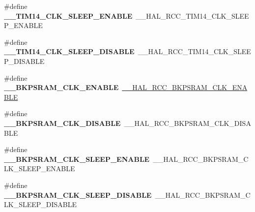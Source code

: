 \begin{DoxyCompactItemize}
\mbox{\label{group___h_a_l___r_c_c___aliased_ga665eb8ea877917808e0be7ef467d1a0d}} 
\#define {\bfseries \+\_\+\+\_\+\+T\+I\+M14\+\_\+\+C\+L\+K\+\_\+\+S\+L\+E\+E\+P\+\_\+\+E\+N\+A\+B\+LE}~\+\_\+\+\_\+\+H\+A\+L\+\_\+\+R\+C\+C\+\_\+\+T\+I\+M14\+\_\+\+C\+L\+K\+\_\+\+S\+L\+E\+E\+P\+\_\+\+E\+N\+A\+B\+LE
\item 
\mbox{\label{group___h_a_l___r_c_c___aliased_ga71fcbff820f7263e13dbbb2b1ae224dc}} 
\#define {\bfseries \+\_\+\+\_\+\+T\+I\+M14\+\_\+\+C\+L\+K\+\_\+\+S\+L\+E\+E\+P\+\_\+\+D\+I\+S\+A\+B\+LE}~\+\_\+\+\_\+\+H\+A\+L\+\_\+\+R\+C\+C\+\_\+\+T\+I\+M14\+\_\+\+C\+L\+K\+\_\+\+S\+L\+E\+E\+P\+\_\+\+D\+I\+S\+A\+B\+LE
\item 
\mbox{\label{group___h_a_l___r_c_c___aliased_ga1ef09e51c04879938b3c77bab8fee584}} 
\#define {\bfseries \+\_\+\+\_\+\+B\+K\+P\+S\+R\+A\+M\+\_\+\+C\+L\+K\+\_\+\+E\+N\+A\+B\+LE}~\mbox{\hyperlink{group___r_c_c_ex___peripheral___clock___enable___disable_ga0e00f0ad54ffe188998d9fa4dbc211f2}{\+\_\+\+\_\+\+H\+A\+L\+\_\+\+R\+C\+C\+\_\+\+B\+K\+P\+S\+R\+A\+M\+\_\+\+C\+L\+K\+\_\+\+E\+N\+A\+B\+LE}}
\item 
\mbox{\label{group___h_a_l___r_c_c___aliased_ga8bdedfe40e391ab3fea620a0655aa221}} 
\#define {\bfseries \+\_\+\+\_\+\+B\+K\+P\+S\+R\+A\+M\+\_\+\+C\+L\+K\+\_\+\+D\+I\+S\+A\+B\+LE}~\+\_\+\+\_\+\+H\+A\+L\+\_\+\+R\+C\+C\+\_\+\+B\+K\+P\+S\+R\+A\+M\+\_\+\+C\+L\+K\+\_\+\+D\+I\+S\+A\+B\+LE
\item 
\mbox{\label{group___h_a_l___r_c_c___aliased_ga1d57b2bcc7d644008f0fa757ef43f06e}} 
\#define {\bfseries \+\_\+\+\_\+\+B\+K\+P\+S\+R\+A\+M\+\_\+\+C\+L\+K\+\_\+\+S\+L\+E\+E\+P\+\_\+\+E\+N\+A\+B\+LE}~\+\_\+\+\_\+\+H\+A\+L\+\_\+\+R\+C\+C\+\_\+\+B\+K\+P\+S\+R\+A\+M\+\_\+\+C\+L\+K\+\_\+\+S\+L\+E\+E\+P\+\_\+\+E\+N\+A\+B\+LE
\item 
\mbox{\label{group___h_a_l___r_c_c___aliased_ga350a0726c08b726815f58e4c5689db5a}} 
\#define {\bfseries \+\_\+\+\_\+\+B\+K\+P\+S\+R\+A\+M\+\_\+\+C\+L\+K\+\_\+\+S\+L\+E\+E\+P\+\_\+\+D\+I\+S\+A\+B\+LE}~\+\_\+\+\_\+\+H\+A\+L\+\_\+\+R\+C\+C\+\_\+\+B\+K\+P\+S\+R\+A\+M\+\_\+\+C\+L\+K\+\_\+\+S\+L\+E\+E\+P\+\_\+\+D\+I\+S\+A\+B\+LE

\end{DoxyCompactItemize}
